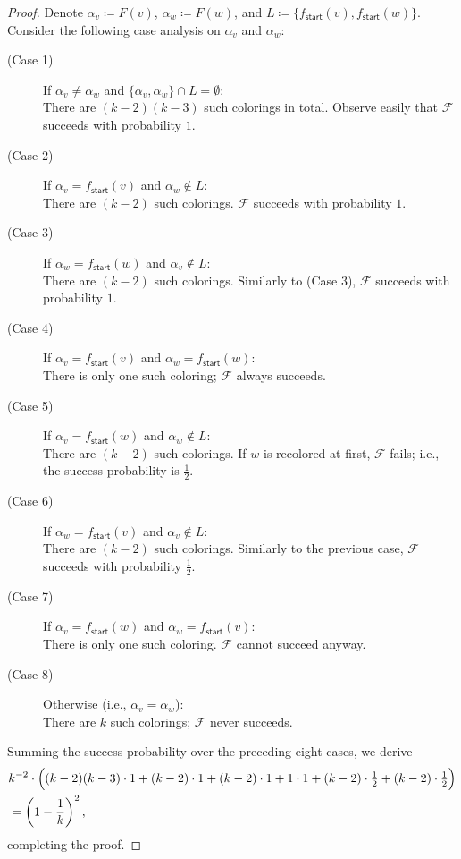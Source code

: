 \documentclass[11pt,fleqn]{article}
\newcommand{\defeq}{\coloneq}
\newcommand{\sss}{\mathsf{start}}
\newcommand{\f}{f}
\newcommand{\frnd}{F}
\newcommand{\sqcol}{\scrF}
\newcommand{\scrF}{\mathscr{F}}
\theoremstyle{definition}
\numberwithin{equation}{section}
\begin{document}
\begin{proof} Denote
$\alpha_v \defeq \frnd(v)$,
$\alpha_w \defeq \frnd(w)$, and
$L \defeq \{\f_\sss(v), \f_\sss(w)\}$.
Consider the following case analysis on $\alpha_v$ and $\alpha_w$:

\begin{description}
    \item[(Case 1)]
        If $\alpha_v \neq \alpha_w$ and
            $\{\alpha_v, \alpha_w\} \cap L = \emptyset$: \\
        There are $(k-2)(k-3)$ such colorings in total.
        Observe easily that $\sqcol$ succeeds with probability $1$.
    \item[(Case 2)]
        If $\alpha_v = \f_\sss(v)$ and $\alpha_w \notin L$: \\
        There are $(k-2)$ such colorings.
        $\sqcol$ succeeds with probability $1$.
    \item[(Case 3)]
        If $\alpha_w = \f_\sss(w)$ and $\alpha_v \notin L$: \\
        There are $(k-2)$ such colorings.
        Similarly to (Case 3),
        $\sqcol$ succeeds with probability $1$.
    \item[(Case 4)]
        If $\alpha_v = \f_\sss(v)$ and $\alpha_w = \f_\sss(w)$: \\
        There is only one such coloring;
        $\sqcol$ always succeeds.
    \item[(Case 5)]
        If $\alpha_v = \f_\sss(w)$ and $\alpha_w \notin L$: \\
        There are $(k-2)$ such colorings.
        If $w$ is recolored at first, $\sqcol$ fails; i.e.,
        the success probability is $\frac{1}{2}$.
    \item[(Case 6)]
        If $\alpha_w = \f_\sss(v)$ and $\alpha_v \notin L$: \\
        There are $(k-2)$ such colorings.
        Similarly to the previous case,
        $\sqcol$ succeeds with probability $\frac{1}{2}$.
    \item[(Case 7)]
        If $\alpha_v = \f_\sss(w)$ and $\alpha_w = \f_\sss(v)$: \\
        There is only one such coloring.
        $\sqcol$ cannot succeed anyway.
    \item[(Case 8)]
        Otherwise (i.e., $\alpha_v = \alpha_w$): \\
        There are $k$ such colorings;
        $\sqcol$ never succeeds.
\end{description}
Summing the success probability over the preceding eight cases,
we derive
\begin{align}
\begin{aligned}
    & k^{-2} \cdot \Bigl(
    (k-2)(k-3) \cdot 1
    + (k-2) \cdot 1 + (k-2) \cdot 1 + 1 \cdot 1
    + (k-2) \cdot \tfrac{1}{2} + (k-2) \cdot \tfrac{1}{2}
    \Bigr)
    \\
    & = \left(1-\frac{1}{k}\right)^2,
\end{aligned}
\end{align}
completing the proof.
\end{proof}
\end{document}
